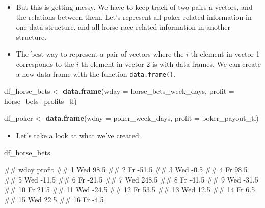 \documentclass[
]{book}
\newenvironment{Shaded}{\begin{snugshade}}{\end{snugshade}}
\newcommand{\AttributeTok}[1]{\textcolor[rgb]{0.13,0.29,0.53}{#1}}
\newcommand{\FunctionTok}[1]{\textcolor[rgb]{0.13,0.29,0.53}{\textbf{#1}}}
\newcommand{\NormalTok}[1]{#1}
\newcommand{\OtherTok}[1]{\textcolor[rgb]{0.56,0.35,0.01}{#1}}
\providecommand{\tightlist}{%
  \setlength{\itemsep}{0pt}\setlength{\parskip}{0pt}}
\begin{document}
\begin{itemize}
\item
  But this is getting messy. We have to keep track of two pairs a vectors, and the relations between them. Let's represent all poker-related information in one data structure, and all horse race-related information in another structure.
\item
  The best way to represent a pair of vectors where the \(i\)-th element in vector 1 corresponds to the \(i\)-th element in vector 2 is with data frames. We can create a new data frame with the function \texttt{data.frame()}.
\end{itemize}

\begin{Shaded}
\begin{Highlighting}[]
\NormalTok{df\_horse\_bets }\OtherTok{\textless{}{-}} 
  \FunctionTok{data.frame}\NormalTok{(}\AttributeTok{wday =}\NormalTok{ horse\_bets\_week\_days, }
             \AttributeTok{profit =}\NormalTok{ horse\_bets\_profits\_tl)}
\end{Highlighting}
\end{Shaded}

\begin{Shaded}
\begin{Highlighting}[]
\NormalTok{df\_poker }\OtherTok{\textless{}{-}} 
  \FunctionTok{data.frame}\NormalTok{(}\AttributeTok{wday =}\NormalTok{ poker\_week\_days, }
             \AttributeTok{profit =}\NormalTok{ poker\_payout\_tl)}
\end{Highlighting}
\end{Shaded}

\begin{itemize}
\tightlist
\item
  Let's take a look at what we've created.
\end{itemize}

\begin{Shaded}
\begin{Highlighting}[]
\NormalTok{df\_horse\_bets}
\end{Highlighting}
\end{Shaded}

\begin{Shaded}
\begin{Highlighting}[]
\NormalTok{\#\#    wday profit}
\NormalTok{\#\# 1   Wed   98.5}
\NormalTok{\#\# 2    Fr  {-}51.5}
\NormalTok{\#\# 3   Wed   {-}0.5}
\NormalTok{\#\# 4    Fr   98.5}
\NormalTok{\#\# 5   Wed  {-}11.5}
\NormalTok{\#\# 6    Fr  {-}21.5}
\NormalTok{\#\# 7   Wed  248.5}
\NormalTok{\#\# 8    Fr  {-}41.5}
\NormalTok{\#\# 9   Wed  {-}31.5}
\NormalTok{\#\# 10   Fr   21.5}
\NormalTok{\#\# 11  Wed  {-}24.5}
\NormalTok{\#\# 12   Fr   53.5}
\NormalTok{\#\# 13  Wed   12.5}
\NormalTok{\#\# 14   Fr    6.5}
\NormalTok{\#\# 15  Wed   22.5}
\NormalTok{\#\# 16   Fr   {-}4.5}
\end{Highlighting}
\end{Shaded}
\end{document}
